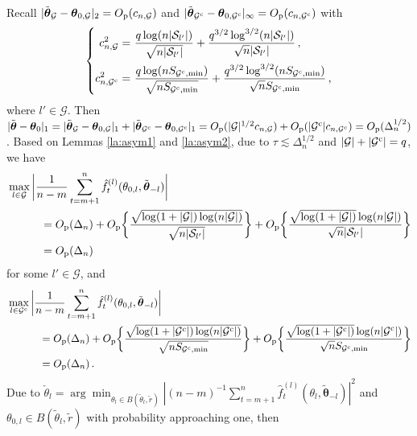 \documentclass[12pt]{article}
\newcommand{\btheta}{\boldsymbol \theta}
\newcommand{\btc}{{\rm c}}
\newcommand{\0}{{\bf 0}}
\begin{document}
Recall $|\tilde{\btheta}_{\mathcal{G}}-\btheta_{0,\mathcal{G}}|_2=O_{\rm p}(c_{n,\mathcal{G}})$ and $|\tilde{\btheta}_{\mathcal{G}^{\btc}}-\btheta_{0,\mathcal{G}^{\btc}}|_\infty=O_{\rm p}(c_{n,\mathcal{G}^{\btc}})$ with \begin{align*}
\left\{\begin{aligned}
   c_{n,\mathcal{G}}^2=&~\frac{q\log(n|\mathcal{S}_{l'}|)}{\sqrt{n|\mathcal{S}_{l'}|}}+\frac{q^{3/2}\log^{3/2}(n|\mathcal{S}_{l'}|)}{\sqrt{n}|\mathcal{S}_{l'}|}\,, \\
   c_{n,\mathcal{G}^{\btc}}^2=&~\frac{q\log(nS_{\mathcal{G}^{\btc},\min})}{\sqrt{nS_{\mathcal{G}^{\btc},\min}}}+\frac{q^{3/2}\log^{3/2}(nS_{\mathcal{G}^{\btc},\min})}{\sqrt{n}S_{\mathcal{G}^{\btc},\min}}\,,
\end{aligned}\right.
\end{align*}
where $l'\in\mathcal{G}$. Then $|\tilde{\btheta}-\btheta_0|_1=|\tilde{\btheta}_{\mathcal{G}}-\btheta_{0,\mathcal{G}}|_1+|\tilde{\btheta}_{\mathcal{G}^{\btc}}-\btheta_{0,\mathcal{G}^{\btc}}|_1=O_{\rm p}(|\mathcal{G}|^{1/2}c_{n,\mathcal{G}})+O_{\rm p}(|\mathcal{G}^{\btc}|c_{n,\mathcal{G}^{\btc}})=O_{\rm p}(\Delta_n^{1/2})$. Based on Lemmas \ref{la:asym1} and \ref{la:asym2}, due to $\tau\lesssim \Delta_n^{1/2}$ and $|\mathcal{G}|+|\mathcal{G}^{\btc}|=q$, we have
\begin{align*}
&\max_{l\in\mathcal{G}}\bigg|\frac{1}{n-m}\sum_{t=m+1}^n\hat{f}_t^{(l)}(\theta_{0,l},\tilde{\btheta}_{-l})\bigg|\\
&~~~~~~~~~=O_{\rm p}(\Delta_n)+O_{\rm p}\bigg\{\frac{\sqrt{\log(1+|\mathcal{G}|)\log(n|\mathcal{G}|)}}{\sqrt{n|\mathcal{S}_{l'}|}}\bigg\}+O_{\rm p}\bigg\{\frac{\sqrt{\log(1+|\mathcal{G}|)}\log(n|\mathcal{G}|)}{\sqrt{n}|\mathcal{S}_{l'}|}\bigg\}\\
&~~~~~~~~~=O_{\rm p}(\Delta_n)
\end{align*}
for some $l'\in\mathcal{G}$, and 
\begin{align*}
&\max_{l\in\mathcal{G}^{\btc}}\bigg|\frac{1}{n-m}\sum_{t=m+1}^n\hat{f}_t^{(l)}(\theta_{0,l},\tilde{\btheta}_{-l})\bigg|\\
&~~~~~~~~~=O_{\rm p}(\Delta_n)+O_{\rm p}\bigg\{\frac{\sqrt{\log(1+|\mathcal{G}^{\btc}|)\log(n|\mathcal{G}^{\btc}|)}}{\sqrt{nS_{\mathcal{G}^{\btc},\min}}}\bigg\}+O_{\rm p}\bigg\{\frac{\sqrt{\log(1+|\mathcal{G}^{\btc}|)}\log(n|\mathcal{G}^{\btc}|)}{\sqrt{n}S_{\mathcal{G}^{\btc},\min}}\bigg\}\\
&~~~~~~~~~=O_{\rm p}(\Delta_n)\,.
\end{align*}
Due to $\check{\theta}_l=\arg\min_{\theta_l\in B(\tilde{\theta}_l,\tilde{r})}|(n-m)^{-1}\sum_{t=m+1}^n\hat{f}_t^{(l)}(\theta_l,\tilde{\btheta}_{-l})|^2$ and $\theta_{0,l}\in B(\tilde{\theta}_l,\tilde{r})$ with probability approaching one, then
\end{document}
